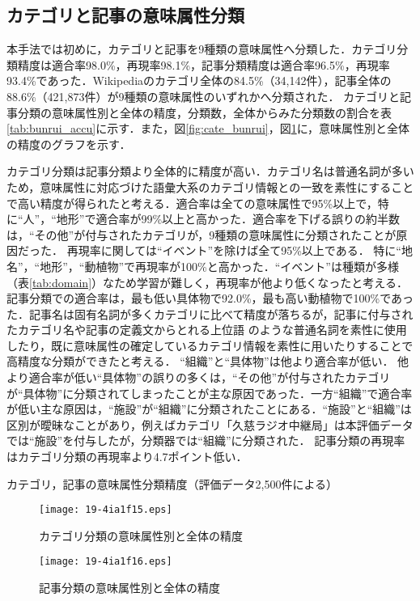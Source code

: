 \documentclass[japanese]{jnlp_1.4}
\begin{document}
\subsection{カテゴリと記事の意味属性分類}

本手法では初めに，カテゴリと記事を9種類の意味属性へ分類した．カテゴリ分類精度は適合率98.0\%，再現率98.1\%，記事分類精度は適合率96.5\%，再現率93.4\%であった．Wikipediaのカテゴリ全体の84.5\%（34,142件），記事全体の88.6\%（421,873件）が9種類の意味属性のいずれかへ分類された．
カテゴリと記事分類の意味属性別と全体の精度，分類数，全体からみた分類数の割合を表\ref{tab:bunrui_accu}に示す．また，図\ref{fig:cate_bunrui}，図\ref{fig:kizi_bunrui}に，意味属性別と全体の精度のグラフを示す．

カテゴリ分類は記事分類より全体的に精度が高い．カテゴリ名は普通名詞が多いため，意味属性に対応づけた語彙大系のカテゴリ情報との一致を素性にすることで高い精度が得られたと考える．適合率は全ての意味属性で95\%以上で，特に``人''，``地形''で適合率が99\%以上と高かった．適合率を下げる誤りの約半数は，``その他''が付与されたカテゴリが，9種類の意味属性に分類されたことが原因だった．
再現率に関しては``イベント''を除けば全て95\%以上である．
特に``地名''，``地形''，``動植物''で再現率が100\%と高かった．``イベント''は種類が多様（表\ref{tab:domain}）なため学習が難しく，再現率が他より低くなったと考える．\\
\indent 記事分類での適合率は，最も低い具体物で92.0\%，最も高い動植物で100\%であった．記事名は固有名詞が多くカテゴリに比べて精度が落ちるが，記事に付与されたカテゴリ名や記事の定義文からとれる上位語
のような普通名詞を素性に使用したり，既に意味属性の確定しているカテゴリ情報を素性に用いたりすることで高精度な分類ができたと考える．
``組織''と``具体物''は他より適合率が低い．
他より適合率が低い``具体物''の誤りの多くは，``その他''が付与されたカテゴリが``具体物''に分類されてしまったことが主な原因であった．一方``組織''で適合率が低い主な原因は，``施設''が``組織''に分類されたことにある．``施設''と``組織''は区別が曖昧なことがあり，例えばカテゴリ「久慈ラジオ中継局」は本評価データでは``施設''を付与したが，分類器では``組織''に分類された．
記事分類の再現率はカテゴリ分類の再現率より4.7ポイント低い．

\begin{table}[t]
\caption{カテゴリ，記事の意味属性分類精度（評価データ2,500件による）}
\label{tab:bunrui_accu}

\end{table}
\begin{figure}[t]
\begin{minipage}[t]{0.5\textwidth}
\begin{center}
\texttt{[image: 19-4ia1f15.eps]}
\end{center}
\caption{カテゴリ分類の意味属性別と全体の精度}
\label{fig:cate_bunrui}
\end{minipage}
\begin{minipage}[t]{0.5\columnwidth}
\begin{center}
\texttt{[image: 19-4ia1f16.eps]}
\end{center}
\caption{記事分類の意味属性別と全体の精度}
\label{fig:kizi_bunrui}
\end{minipage}
\end{figure}
\end{document}
